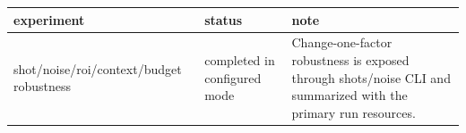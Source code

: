 \begin{tabular}{lll}
\toprule
experiment & status & note \\
\midrule
shot/noise/roi/context/budget robustness & completed in configured mode & Change-one-factor robustness is exposed through shots/noise CLI and summarized with the primary run resources. \\
\bottomrule
\end{tabular}
